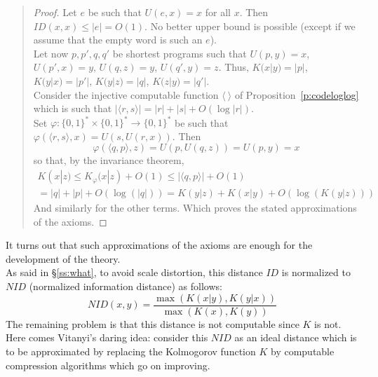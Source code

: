 {\small\begin{quote}
\begin{proof}
Let $e$ be such that $U(e,x)=x$ for all $x$.
Then $ID(x,x)\leq|e|=O(1)$. No better upper bound is possible
(except if we assume that the empty word is such an $e$).
\\
Let now $p,p',q,q'$ be shortest programs such that
$U(p,y)=x$, $U(p',x)=y$, $U(q,z)=y$, $U(q',y)=z$.
Thus,
$K(x|y)=|p|$, $K(y|x)=|p'|$, $K(y|z)=|q|$, $K(z|y)=|q'|$.
\\
Consider the injective computable function $\langle\ \rangle$
of Proposition~\ref{p:codeloglog} which is such that
$|\langle r,s \rangle|=|r|+|s|+O(\log |r|)$.
\\
Set $\varphi:{\{0,1\}^*}\times{\{0,1\}^*}\to{\{0,1\}^*}$ be such that
$\varphi(\langle r,s \rangle, x) = U(s,U(r,x))$.
Then
$$
\varphi(\langle q,p \rangle,z) = U(p,U(q,z)) = U(p,y) = x
$$
so that, by the invariance theorem,
\begin{multline*}
K(x|z)\leq K_\varphi(x|z)+O(1)\leq|\langle q,p \rangle|+O(1)
\\
= |q|+|p|+ O(\log(|q|))
= K(y|z)+K(x|y)+O(\log(K(y|z)))
\end{multline*}
And similarly for the other terms.
Which proves the stated approximations of the axioms.
\end{proof}
\end{quote}}
It turns out that such approximations of the axioms
are enough for the development of the theory.
\medskip\\
As said in \S\ref{ss:what}, to avoid scale distortion,
this distance $ID$ is normalized to $NID$
(normalized information distance) as follows:
$$
NID(x,y) = \frac{\max(K(x|y),K(y|x))}{\max(K(x),K(y))}
$$
The remaining problem is that this distance is not computable
since $K$ is not.
Here comes Vitanyi's daring idea:
consider this $NID$ as an ideal distance which
is to be approximated by replacing the Kolmogorov function $K$
by computable compression algorithms which go on improving. 
